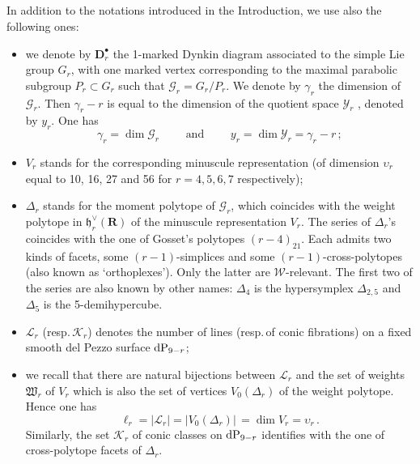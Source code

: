 \documentclass[11pt]{amsart}
\newcommand{\sk}{\smallskip}
\begin{document}
 
 \subsection{}  
 \label{S:7-1}
 In addition to the notations introduced in the Introduction, we use also the following ones: 
\begin{itemize}
\item we denote by $\boldsymbol{D}_r^\bullet$ the 1-marked Dynkin diagram associated to the simple Lie group $G_r$, with one marked vertex corresponding to the maximal parabolic subgroup $P_r\subset G_r$ such that 
$\boldsymbol{\mathcal G}_r=G_r/P_r$. We denote by $\gamma_r$ the dimension of $\boldsymbol{\mathcal G}_r$. Then $\gamma_r-r$ is equal to the dimension of the quotient 
space $\boldsymbol{\mathcal Y}_r$ , denoted by $y_r$. One has 
$$
\gamma_r=\dim \boldsymbol{\mathcal G}_r\qquad \mbox{ and } 
\qquad y_r=\dim \boldsymbol{\mathcal Y}_r=\gamma_r-r\, ;
$$
\sk 
\item  $V_r$ stands for the corresponding minuscule representation (of dimension $\upsilon_r$ equal to 10, 16, 27 and 56 for $r=4,5,6,7$ respectively);
\sk 
\item $\Delta_r$ stands for the moment polytope of $\boldsymbol{\mathcal G}_r$, which coincides with the weight polytope in $\mathfrak h_r^\vee (\mathbf R)$ of the minuscule representation $V_r$.  The series of $\Delta_r$'s coincides with the one of Gosset's polytopes $(r-4)_{21}$. Each admits two kinds of facets, some $(r-1)$-simplices and some $(r-1)$-cross-polytopes (also known as `orthoplexes'). Only the latter are $\boldsymbol{\mathcal W}$-relevant. 
The first two of the series are also known by other names: 
$\Delta_4$ is the hypersymplex $\Delta_{2,5}$ and $\Delta_5$ is the 5-demihypercube. 
\sk 
\item  $\boldsymbol{\mathcal L}_r$ (resp.\,$\boldsymbol{\mathcal K}_r$) denotes the number of lines (resp.\,of conic fibrations) on a fixed smooth del Pezzo surface ${\rm dP}_{9-r}$; 
\sk 
\item we recall that  there are natural bijections between $\boldsymbol{\mathcal L}_r$ and the set of weights $\mathfrak W_r$ of $V_r$ which is also the set of 
vertices $V_0(\Delta_r)$ of the weight polytope. Hence one has 
$$\ell_r=\big\lvert \boldsymbol{\mathcal L}_r\big\lvert= \big\lvert V_0(\Delta_r)\big\lvert \,  =\dim V_r=\upsilon_r\, .$$ Similarly, the set $\boldsymbol{\mathcal K}_r$ of conic classes on ${\rm dP}_{9-r}$ identifies with the one of cross-polytope facets of $\Delta_r$. 
\end{itemize}
\end{document}
